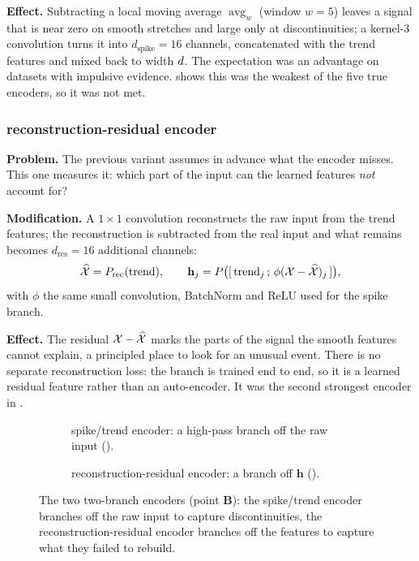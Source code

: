 \textbf{Effect.} Subtracting a local moving average $\operatorname{avg}_w$ (window $w = 5$) leaves a
signal that is near zero on smooth stretches and large only at discontinuities; a kernel-3
convolution turns it into $d_{\text{spike}} = 16$ channels, concatenated with the trend features and
mixed back to width $d$. The expectation was an advantage on datasets with impulsive evidence.
 shows this was the weakest of the five true encoders, so it was not met.

\subsubsection{\seanet{} reconstruction-residual encoder}
\label{sec:var:recon}

\textbf{Problem.} The previous variant assumes in advance what the encoder misses. This one measures
it: which part of the input can the learned features \emph{not} account for?

\textbf{Modification.} A $1\times1$ convolution reconstructs the raw input from the trend features;
the reconstruction is subtracted from the real input and what remains becomes
$d_{\text{res}} = 16$ additional channels:
\begin{equation}
  \widehat{\mathcal{X}} = P_{\text{rec}}(\text{trend}), \qquad
  \mathbf{h}_j = P\big([\,\text{trend}_j \,;\, \phi(\mathcal{X} - \widehat{\mathcal{X}})_j\,]\big),
  \label{eq:recon}
\end{equation}
with $\phi$ the same small convolution, BatchNorm and ReLU used for the spike branch.

\textbf{Effect.} The residual $\mathcal{X} - \widehat{\mathcal{X}}$ marks the parts of the signal the smooth
features cannot explain, a principled place to look for an unusual event. There is no separate
reconstruction loss: the branch is trained end to end, so it is a learned residual feature rather
than an auto-encoder. It was the second strongest encoder in .

\begin{figure}[htbp]
  \centering
  \begin{subfigure}[t]{0.49\linewidth}
    \centering
    
    \caption{\seanet{} spike/trend encoder: a high-pass branch off the raw input
    ().}
    \label{fig:var_spiketrend}
  \end{subfigure}\hfill
  \begin{subfigure}[t]{0.49\linewidth}
    \centering
    
    \caption{\seanet{} reconstruction-residual encoder: a branch off $\mathbf{h}$
    ().}
    \label{fig:var_recon}
  \end{subfigure}
  \caption{The two two-branch \seanet{} encoders (point \textbf{B}): the spike/trend encoder
  branches off the raw input to capture discontinuities, the reconstruction-residual encoder
  branches off the features to capture what they failed to rebuild.}
  \label{fig:var_branches}
\end{figure}

